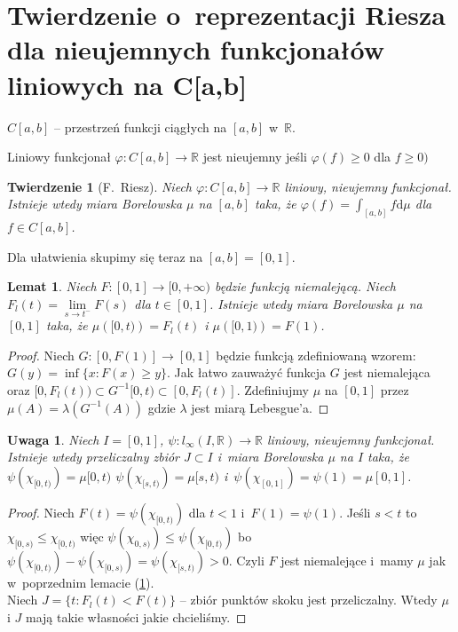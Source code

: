 \documentclass[11pt]{mwrep}
\renewcommand{\[}{\begin{equation}}
\renewcommand{\]}{\end{equation}}
\newcommand{\R}{{\ensuremath{\mathbb R}}}
\newcommand{\dd}{\mathrm{d}}
\newtheorem{twr}[subsection]{Twierdzenie}%
\newtheorem{lem}[subsection]{Lemat}
\newtheorem{uw}[subsection]{Uwaga}
\begin{document}
\section{Twierdzenie o~reprezentacji  Riesza dla nieujemnych funkcjonałów liniowych na C[a,b]}
$C[a,b]$ -- przestrzeń funkcji ciągłych na $[a,b]$ w~$\R$.\par
Liniowy funkcjonał $\varphi:C[a,b]\to \R$ jest nieujemny jeśli $\varphi(f)\ge 0$ dla $f \ge 0)$
\begin{twr}[F.~Riesz]
Niech $\varphi:C[a,b]\to \R$ liniowy, nieujemny  funkcjonał.
Istnieje wtedy miara Borelowska $\mu$ na $[a,b]$ taka, że $\varphi(f) = \int_{[a,b]} f \dd \mu$ dla $f\in C[a,b]$.
\end{twr}
Dla ułatwienia skupimy się teraz na $[a,b]=[0,1]$.
\begin{lem} \label{lem:Riesz1}
  Niech $F\colon[0,1]\to [0,+\infty)$ będzie funkcją niemalejącą. Niech $F_l(t) = \lim\limits_{s\to t^-} F(s)$ dla $t\in[0,1]$. 
  Istnieje wtedy miara Borelowska $\mu$ na $[0,1]$
  taka, że $\mu\left( [0,t) \right) = F_{l}(t)$ i $\mu\left( [0,1) \right) = F(1)$.
\end{lem}
\begin{proof}
			Niech $G\colon[0,F(1)] \to [0,1]$ będzie funkcją zdefiniowaną wzorem: $G(y) = \inf\{x: F(x) \ge y\}$.
			Jak łatwo zauważyć funkcja $G$ jest niemalejąca oraz  $[0,F_l(t)) \subset G^{-1}[0,t)\subset [0,F_l(t)]$.
			Zdefiniujmy $\mu$ na $[0,1]$ przez $\mu(A) = \lambda(G^{-1}(A))$ gdzie $\lambda$ jest miarą Lebesgue'a.
\end{proof}
\begin{uw}
	Niech $I=[0,1]$, $\psi: l_\infty (I,\R)\to \R$ liniowy, nieujemny  funkcjonał. 
	Istnieje wtedy  przeliczalny zbiór $J\subset I$ i~miara Borelowska $\mu$ na $I$ taka, że $\psi\left(\chi_{[0,t)} \right) = \mu[0,t)$ 
		$\psi \left( \chi_{[s,t)}  \right)  = \mu[s,t)$ i~$\psi(\chi_{[0,1]}) = \psi(1) = \mu[0,1]$.
\end{uw}
\begin{proof}
	Niech $F(t) = \psi\left( \chi_{[0,t)} \right)$ dla $t<1$ i~$F(1) = \psi(1)$.
	Jeśli $s<t$ to $\chi_{[0,s)} \le \chi_{[0,t)}$ więc $\psi\left( \chi_{0,s)} \right) \le \psi \left( \chi_{[0,t)} \right)$
		bo $\psi (\chi_{[0,t)} ) - \psi (\chi_{[0,s)}) = \psi(\chi_{[s,t)}) >0$.
	Czyli $F$ jest niemalejące i~mamy $\mu$ jak w~poprzednim lemacie (\ref{lem:Riesz1}).\\
	Niech $J= \{t: F_l (t) < F(t)\}$ -- zbiór punktów skoku jest przeliczalny. 
	Wtedy $\mu$ i $J$ mają takie własności jakie chcieliśmy. 
\end{proof}
\end{document}
